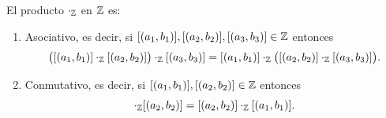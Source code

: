 \documentclass[12pt,a4paper]{book}
\begin{document}
    \begin{proposicion}
        \label{prop:producto-Z-propiedades}
        El producto $\cdot_{\mathbb{Z}}$ en $\mathbb{Z}$ es:
        \begin{enumerate}
            \item[(1)] Asociativo, es decir, si $[(a_{1},b_{1})],[(a_{2},b_{2})],[(a_{3},b_{3})]\in\mathbb{Z}$ entonces
            \begin{equation*}
                \big([(a_{1},b_{1})]\cdot_{\mathbb{Z}}[(a_{2},b_{2})]\big)\cdot_{\mathbb{Z}}[(a_{3},b_{3})] = [(a_{1},b_{1})]\cdot_{\mathbb{Z}}\big([(a_{2},b_{2})]\cdot_{\mathbb{Z}}[(a_{3},b_{3})]\big).
            \end{equation*}
            \item[(2)] Conmutativo, es decir, si $[(a_{1},b_{1})],[(a_{2},b_{2})]\in\mathbb{Z}$ entonces
            \begin{equation*}
                [(a_{1},b_{1})]\cdot_{\Z}[(a_{2},b_{2})]=[(a_{2},b_{2})]\cdot_{\Z}[(a_{1},b_{1})].
            \end{equation*}
        \end{enumerate}
    \end{proposicion}
\end{document}
